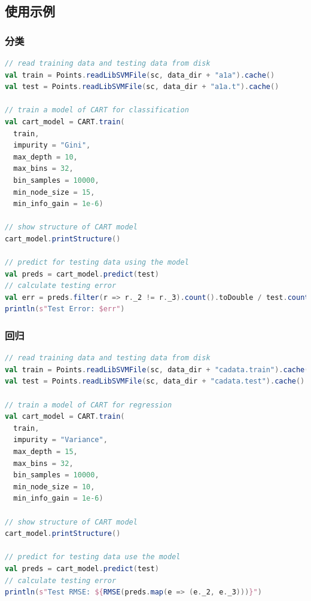 \documentclass[a4paper,11pt,         %
               ]{article}
\begin{document}
\subsection{使用示例}

\subsubsection{分类}

\begin{lstlisting}[language={SCALA},title={RunCARTForClassification.scala}]  
// read training data and testing data from disk
val train = Points.readLibSVMFile(sc, data_dir + "a1a").cache()
val test = Points.readLibSVMFile(sc, data_dir + "a1a.t").cache()

// train a model of CART for classification
val cart_model = CART.train(
  train,
  impurity = "Gini",
  max_depth = 10,
  max_bins = 32,
  bin_samples = 10000,
  min_node_size = 15,
  min_info_gain = 1e-6)

// show structure of CART model
cart_model.printStructure()

// predict for testing data using the model
val preds = cart_model.predict(test)
// calculate testing error
val err = preds.filter(r => r._2 != r._3).count().toDouble / test.count()
println(s"Test Error: $err")
\end{lstlisting}  

\subsubsection{回归}

\begin{lstlisting}[language={SCALA},title={RunCARTForRegression.scala}]  
// read training data and testing data from disk
val train = Points.readLibSVMFile(sc, data_dir + "cadata.train").cache()
val test = Points.readLibSVMFile(sc, data_dir + "cadata.test").cache()

// train a model of CART for regression
val cart_model = CART.train(
  train,
  impurity = "Variance",
  max_depth = 15,
  max_bins = 32,
  bin_samples = 10000,
  min_node_size = 10,
  min_info_gain = 1e-6)

// show structure of CART model
cart_model.printStructure()

// predict for testing data use the model
val preds = cart_model.predict(test)
// calculate testing error
println(s"Test RMSE: ${RMSE(preds.map(e => (e._2, e._3)))}")
\end{lstlisting}  
\end{document}

